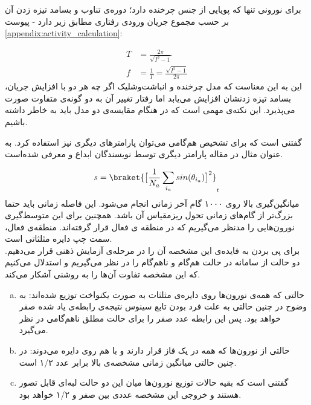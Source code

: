 برای نورونی تنها که پویایی از جنس چرخنده دارد؛ دوره‌ی تناوب و بسامد تیزه زدن آن بر حسب مجموع جریان ورودی‌ رفتاری مطابق زیر دارد - پیوست
\ref{appendix:activity_calculation}:

\begin{align}
	T &= \frac{2\pi}{\sqrt{I^2 - 1}}\\
	f &= \frac{1}{T} = \frac{\sqrt{I^2 - 1}}{2\pi}
\end{align}
این به این معناست که مدل چرخنده و انباشت‌وشلیک اگر چه هر دو با افزایش جریان، بسامد تیزه زدنشان افزایش می‌یابد اما رفتار تغییر آن به دو گونه‌ی متفاوت صورت می‌پذیرد. این نکته‌ی مهمی است که در هنگام مقایسه‌ی دو مدل باید به خاطر داشته باشیم.

گفتنی است که برای تشخیص هم‌گامی می‌توان پارامترهای دیگری نیز استفاده کرد. به عنوان مثال در مقاله
\cite{safaeesirat2020critical}
 پارامتر دیگری توسط نویسندگان ابداع و معرفی شده‌است.

\begin{equation}
	s =  \braket{ \big[ \frac{1}{N_a}\sum_{i_a} sin(\theta_{i_a}) \big]^{2}}_t
	\label{eq:saman_amin_param}
\end{equation}
میانگین‌گیری بالا روی ۱۰۰۰ گام آخر زمانی انجام می‌شود. این فاصله زمانی باید حتما بزرگ‌تر از گام‌های زمانی تحول ریزمقیاس آن باشد. همچنین برای این متوسط‌گیری نورون‌هایی را مدنظر می‌گیریم که در منطقه ی فعال قرار گرفته‌اند. منطقه‌ی فعال، سمت چپ دایره مثلثاتی است.\\
برای پی بردن به فایده‌ی این مشخصه آن را در مرحله‌ی آزمایش ذهنی قرار می‌دهیم. دو حالت از سامانه در حالت هم‌گام و نا‌هم‌گام را در نظر می‌گیریم و استدلال می‌کنیم که این مشخصه تفاوت آن‌ها را به روشنی آشکار می‌کند.\\

\begin{enumerate}[(a)]
	\item 
	حالتی که همه‌ی نورون‌ها روی دایره‌ی مثلثات به صورت یکنواخت توزیع شده‌اند: به وضوح در چنین حالتی به علت فرد بودن تابع سینوس نتیجه‌ی رابطه‌ی یاد شده صفر خواهد بود. پس این رابطه عدد صفر را برای حالت مطلق نا‌هم‌گامی در نظر می‌گیرد.
	\item 
	حالتی از نورون‌ها که همه در یک فاز قرار دارند و با هم روی دایره می‌دوند: در چنین حالتی میانگین زمانی مشخصه‌ی بالا برابر عدد ۱/۲ است.
	\item 
	گفتنی است که بقیه حالات توزیع نورون‌ها میان این دو حالت لبه‌ای قابل تصور هستند و خروجی این مشخصه عددی بین صفر و ۱/۲ خواهد بود.
\end{enumerate}

